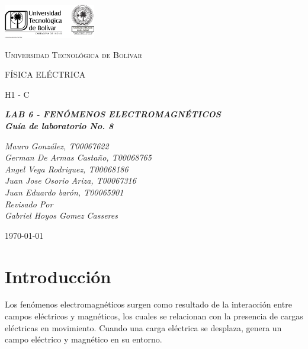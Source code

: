 \documentclass[twocolumn, 12pt]{article}
\begin{document}

\begin{titlepage}
	\centering
	\includegraphics[width=0.3\textwidth]{Images/logo_utb.png}\par\vspace{1cm}
	{\scshape\LARGE Universidad Tecnológica de Bolívar \par}
	\vspace{1cm}

	{\scshape\Large FÍSICA ELÉCTRICA \par}
	\vspace{.2cm}

	{\scshape\Large H1 - C \par}
	\vspace{1cm}
	\slshape {\Large \bfseries{} LAB 6 - FENÓMENOS ELECTROMAGNÉTICOS \\}
	\slshape {\small \bfseries{} Guía de laboratorio No. 8}
	\vspace{1cm}

	\slshape {\itshape{} Mauro González, T00067622 \\}
	\slshape {\itshape{} German De Armas Castaño, T00068765 \\}
	\slshape {\itshape{} Angel Vega Rodriguez, T00068186 \\}
	\slshape {\itshape{} Juan Jose Osorio Ariza, T00067316 \\}
	\slshape {\itshape{} Juan Eduardo barón, T00065901 \\}
	\vfill
	Revisado Por \\
	Gabriel Hoyos Gomez Casseres\\
	{\large \today\par}
\end{titlepage}


\section{Introducción}

Los fenómenos electromagnéticos surgen como resultado de la
interacción entre campos eléctricos y magnéticos, los
cuales se relacionan con la presencia de cargas eléctricas
en movimiento. Cuando una carga eléctrica se desplaza,
genera un campo eléctrico y magnético en su entorno.
\end{document}
